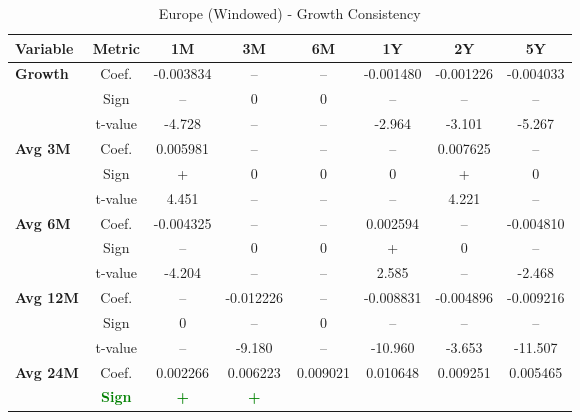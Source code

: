 \documentclass[11pt,english,a4paper,hidelinks]{book}
\begin{document}
\begin{table}[H]
    \centering
    \caption{Europe (Windowed) - Growth Consistency}
    \begin{tabular}{lccccccc}
        \toprule
        \textbf{Variable} & \textbf{Metric} & \textbf{1M} & \textbf{3M} & \textbf{6M} & \textbf{1Y} & \textbf{2Y} & \textbf{5Y} \\
        \midrule
        \multirow{3}{*}{\textbf{Growth}}
            & Coef.   & -0.003834 & --        & --        & -0.001480 & -0.001226 & -0.004033 \\
            & Sign    & –         & 0         & 0         & –         & –         & –         \\
            & t-value & -4.728    & --        & --        & -2.964    & -3.101    & -5.267    \\
        \cmidrule{1-8}
        \multirow{3}{*}{\textbf{Avg 3M}}
            & Coef.   & 0.005981  & --        & --        & --        & 0.007625  & --        \\
            & Sign    & +         & 0         & 0         & 0         & +         & 0         \\
            & t-value & 4.451     & --        & --        & --        & 4.221     & --        \\
        \cmidrule{1-8}
        \multirow{3}{*}{\textbf{Avg 6M}}
            & Coef.   & -0.004325 & --        & --        & 0.002594  & --        & -0.004810 \\
            & Sign    & –         & 0         & 0         & +         & 0         & –         \\
            & t-value & -4.204    & --        & --        & 2.585     & --        & -2.468    \\
        \cmidrule{1-8}
        \multirow{3}{*}{\textbf{Avg 12M}}
            & Coef.   & --        & -0.012226 & --        & -0.008831 & -0.004896 & -0.009216 \\
            & Sign    & 0         & –         & 0         & –         & –         & –         \\
            & t-value & --        & -9.180    & --        & -10.960   & -3.653    & -11.507   \\
        \cmidrule{1-8}
        \multirow{3}{*}{\textbf{Avg 24M}}
            & Coef.   & 0.002266  & 0.006223  & 0.009021  & 0.010648  & 0.009251  & 0.005465  \\
            & \textbf{\textcolor{green}{Sign}}
                     & \textbf{\textcolor{green}{+}}
                     & \textbf{\textcolor{green}{+}}

\end{tabular}
\end{table}
\end{document}
